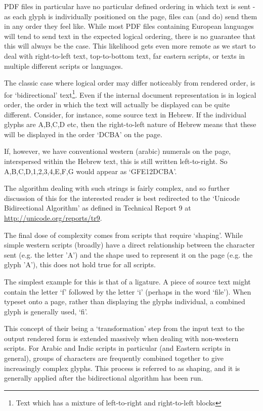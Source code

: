 \documentclass[oneside]{book}
\begin{document}
PDF files in particular have no particular defined ordering in which text is sent - as each glyph is individually positioned on the page, files can (and do) send them in any order they feel like. While most PDF files containing European languages will tend to send text in the expected logical ordering, there is no guarantee that this will always be the case. This likelihood gets even more remote as we start to deal with right-to-left text, top-to-bottom text, far eastern scripts, or texts in multiple different scripts or languages.

The classic case where logical order may differ noticeably from rendered order, is for `bidirectional' text\footnote{Text which has a mixture of left-to-right and right-to-left blocks}. Even if the internal document representation is in logical order, the order in which the text will actually be displayed can be quite different. Consider, for instance, some source text in Hebrew. If the individual glyphs are A,B,C,D etc, then the right-to-left nature of Hebrew means that these will be displayed in the order `DCBA' on the page.

If, however, we have conventional western (arabic) numerals on the page, interspersed within the Hebrew text, this is still written left-to-right. So A,B,C,D,1,2,3,4,E,F,G would appear as `GFE12DCBA'.

The algorithm dealing with such strings is fairly complex, and so further discussion of this for the interested reader is best redirected to the `Unicode Bidirectional Algorithm' as defined in Technical Report 9 at \url{http://unicode.org/reports/tr9}.

The final dose of complexity comes from scripts that require `shaping'. While simple western scripts (broadly) have a direct relationship between the character sent (e.g. the letter 'A') and the shape used to represent it on the page (e.g. the glyph 'A'), this does not hold true for all scripts.

The simplest example for this is that of a ligature. A piece of source text might contain the letter `f' followed by the letter `i' (perhaps in the word `file'). When typeset onto a page, rather than displaying the glyphs individual, a combined glyph is generally used, `fi'.

This concept of their being a `transformation' step from the input text to the output rendered form is extended massively when dealing with non-western scripts. For Arabic and Indic scripts in particular (and Eastern scripts in general), groups of characters are frequently combined together to give increasingly complex glyphs. This process is referred to as shaping, and it is generally applied after the bidirectional algorithm has been run.
\end{document}
